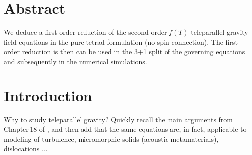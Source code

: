 \documentclass[
10pt, %
a4paper, %
oneside, %
headinclude,footinclude, %
BCOR5mm, %
]{scrartcl}
\begin{document}
\section*{Abstract} %
We deduce a first-order reduction of the second-order $ f(T) $ teleparallel gravity field 
equations 
in the pure-tetrad formulation (no spin connection). The first-order reduction is then can be used 
in the 3+1 split of the governing equations and subsequently in the numerical simulations. 
\let\thefootnote\relax{}
\let\thefootnote\relax{}
\let\thefootnote\relax{}
\let\thefootnote\relax{}


\setlength\parindent{10pt} %
\setlength{\parskip}{5pt} %


\section{Introduction}

Why to study teleparallel gravity? Quickly recall the main arguments from Chapter\,18 of 
\cite{AldrovandiPereiraBook}, and then add that the same equations are, in fact, applicable to 
modeling of 
turbulence, micromorphic solids (acoustic metamaterials), dislocations 
\cite{PRD-Torsion2019}... 
\end{document}
